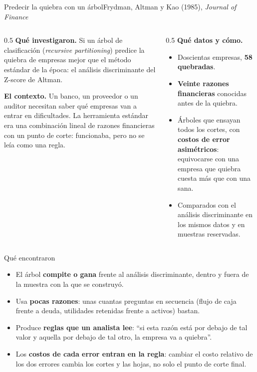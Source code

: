 \documentclass{beamer}
\begin{document}
\begin{frame}{Predecir la quiebra con un árbol}{Frydman, Altman y Kao (1985), \emph{Journal of Finance}}
\small
\begin{columns}[T]
\begin{column}{0.5\textwidth}
\textbf{Qué investigaron.} Si un árbol de clasificación (\emph{recursive partitioning}) predice la quiebra de empresas mejor que el método estándar de la época: el análisis discriminante del Z-score de Altman.

\medskip
\textbf{El contexto.} Un banco, un proveedor o un auditor necesitan saber qué empresas van a entrar en dificultades. La herramienta estándar era una combinación lineal de razones financieras con un punto de corte: funcionaba, pero no se leía como una regla.
\end{column}
\begin{column}{0.5\textwidth}
\textbf{Qué datos y cómo.}
\begin{itemize}\itemsep3pt
  \item Doscientas empresas, \textbf{58 quebradas}.
  \item \textbf{Veinte razones financieras} conocidas antes de la quiebra.
  \item Árboles que ensayan todos los cortes, con \textbf{costos de error asimétricos}: equivocarse con una empresa que quiebra cuesta más que con una sana.
  \item Comparados con el análisis discriminante en los mismos datos y en muestras reservadas.
\end{itemize}
\end{column}
\end{columns}
\end{frame}

\begin{frame}{Qué encontraron}
\small
\begin{itemize}\itemsep5pt
  \item El árbol \textbf{compite o gana} frente al análisis discriminante, dentro y fuera de la muestra con la que se construyó.
  \item Usa \textbf{pocas razones}: unas cuantas preguntas en secuencia (flujo de caja frente a deuda, utilidades retenidas frente a activos) bastan.
  \item Produce \textbf{reglas que un analista lee}: ``si esta razón está por debajo de tal valor y aquella por debajo de tal otro, la empresa va a quiebra''.
  \item Los \textbf{costos de cada error entran en la regla}: cambiar el costo relativo de los dos errores cambia los cortes y las hojas, no solo el punto de corte final.
\end{itemize}
\medskip
{}
\end{frame}
\end{document}
